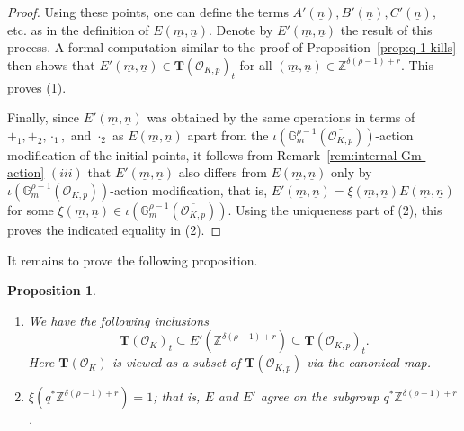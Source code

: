 \documentclass[11pt,oneside]{amsart}
\theoremstyle{plain}
\newtheorem{proposition}[theorem]{Proposition}
\theoremstyle{definition}
\def\G{{\bf G}}
\def\TT{\mathbf{T}}
\def\Z{\mathbb{Z}}
\def\G{\mathbb{G}}
\def\oh{\mathcal{O}}
\begin{document}
\begin{proof}
Using these points, one can define the terms $A'(\underline{n}), B'(\underline{n}), C'(\underline{n}),$ etc. as in the definition of $E(\underline{m}, \underline{n})$. Denote by $E'(\underline{m}, \underline{n})$ the result of this process. A formal computation similar to the proof of Proposition~\ref{prop:q-1-kills} then shows that $E'(\underline{m}, \underline{n}) \in \TT(\oh_{K, p})_{t}$ for all $(\underline{m},\underline{n}) \in \Z^{\delta(\rho-1)+r}$. This proves (1). 

Finally, since $E'(\underline{m}, \underline{n})$ was obtained by the same operations in terms of $+_1, +_2, \cdot_1,$ and $\cdot_2$ as $E(\underline{m}, \underline{n})$ apart from the $\iota(\G_m^{\rho-1}(\overline{\oh_{K, p}}))$-action modification of the initial points, it follows from Remark~\ref{rem:internal-Gm-action} $(iii)$ that $E'(\underline{m}, \underline{n})$ also differs from $E(\underline{m}, \underline{n})$ only by  $\iota(\G_m^{\rho-1}(\overline{\oh_{K, p}}))$-action modification, that is, $E'(\underline{m}, \underline{n})=\xi(\underline{m}, \underline{n})E(\underline{m}, \underline{n})$
for some $\xi(\underline{m}, \underline{n}) \in \iota(\G_m^{\rho-1}(\overline{\oh_{K, p}}))$. Using the uniqueness part of (2), this proves the indicated equality in (2).
\end{proof}

It remains to prove the following proposition.
\begin{proposition} \label{prop:modify-E-by-local-units2}
\begin{enumerate}
\item We have the following inclusions 
$$\TT(\oh_K)_t \subseteq E'(\Z^{\delta(\rho-1)+r}) \subseteq \TT(\oh_{K, p})_t.$$
Here $\TT(\oh_K)$ is viewed as a subset of $\TT(\oh_{K, p})$ via the canonical map.  
\item $\xi(q^*\Z^{\delta(\rho-1)+r})=1$; that is, $E$ and $E'$ agree on the subgroup $q^*\Z^{\delta(\rho-1)+r}$. 
\end{enumerate}
\end{proposition}
\end{document}
